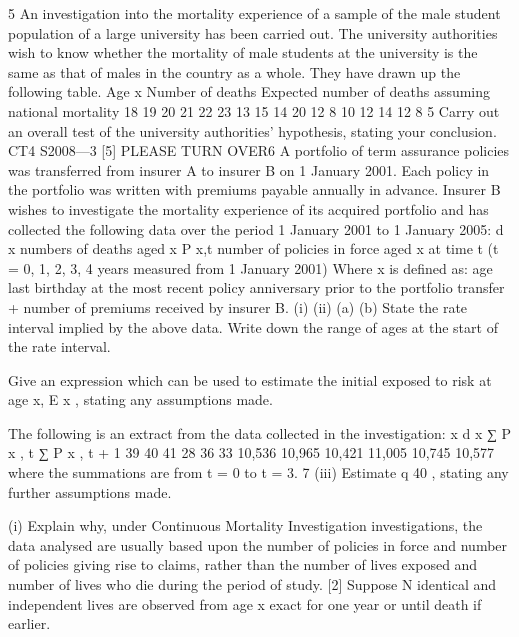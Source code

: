 \documentclass[a4paper,12pt]{article}
\begin{document}
\begin{enumerate}
[Total 5]5
An investigation into the mortality experience of a sample of the male student population of a large university has been carried out. The university authorities wish to know whether the mortality of male students at the university is the same as that of
males in the country as a whole. They have drawn up the following table.
Age x Number of deaths Expected number
of deaths assuming
national mortality
18
19
20
21
22
23 13
15
14
20
12
8 10
12
14
12
8
5
Carry out an overall test of the university authorities’ hypothesis, stating your
conclusion.
CT4 S2008—3
[5]
PLEASE TURN OVER6
A portfolio of term assurance policies was transferred from insurer A to insurer B on 1 January 2001. Each policy in the portfolio was written with premiums payable annually in advance. Insurer B wishes to investigate the mortality experience of its
acquired portfolio and has collected the following data over the period 1 January 2001
to 1 January 2005:
d x numbers of deaths aged x
P x,t number of policies in force aged x at time t (t = 0, 1, 2, 3, 4 years measured
from 1 January 2001)
Where x is defined as:
age last birthday at the most recent policy anniversary prior to the portfolio
transfer + number of premiums received by insurer B.
(i)
(ii)
(a)
(b)
State the rate interval implied by the above data.
Write down the range of ages at the start of the rate interval.

Give an expression which can be used to estimate the initial exposed to risk at age x, E x , stating any assumptions made.

The following is an extract from the data collected in the investigation:
x d x ∑ P x , t ∑ P x , t + 1
39
40
41 28
36
33 10,536
10,965
10,421 11,005
10,745
10,577
where the summations are from t = 0 to t = 3.
7
(iii) Estimate q 40 , stating any further assumptions made.

(i) Explain why, under Continuous Mortality Investigation investigations, the data analysed are usually based upon the number of policies in force and number of policies giving rise to claims, rather than the number of lives
exposed and number of lives who die during the period of study.
[2]
Suppose N identical and independent lives are observed from age x exact for one year
or until death if earlier.


\end{enumerate}
\end{document}
